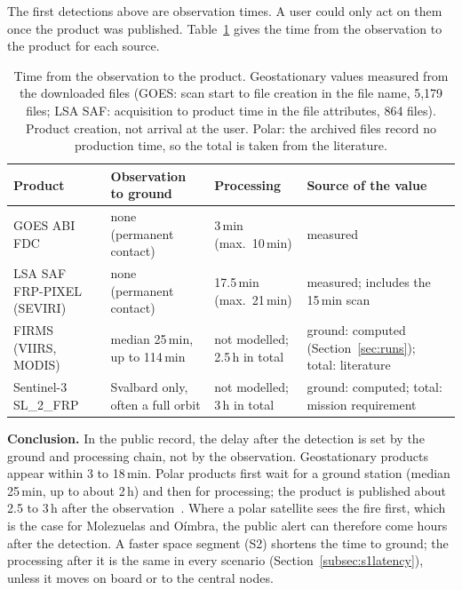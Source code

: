 \documentclass[11pt]{article}
\begin{document}
The first detections above are observation times. A user could only act on them once the product was published. Table~\ref{tab:latency} gives the time from the observation to the product for each source.

\begin{longtable}{|p{3.4cm}|p{3.6cm}|p{3.6cm}|p{4.0cm}|}
\caption{Time from the observation to the product. Geostationary values measured from the downloaded files (GOES: scan start to file creation in the file name, 5{,}179 files; LSA SAF: acquisition to product time in the file attributes, 864 files). Product creation, not arrival at the user. Polar: the archived files record no production time, so the total is taken from the literature.}\label{tab:latency}\\
\hline
\rowcolor{tablehead}
\textbf{Product} & \textbf{Observation to ground} & \textbf{Processing} & \textbf{Source of the value} \\
\hline
\endhead
GOES ABI FDC & none (permanent contact) & 3\,min (max.\ 10\,min) & measured \\
\hline
LSA SAF FRP-PIXEL (SEVIRI) & none (permanent contact) & 17.5\,min (max.\ 21\,min) & measured; includes the 15\,min scan \\
\hline
FIRMS (VIIRS, MODIS) & median 25\,min, up to 114\,min & not modelled; 2.5\,h in total & ground: computed (Section~\ref{sec:runs}); total: literature~\cite{wooster2021active} \\
\hline
Sentinel-3 SL\_2\_FRP & Svalbard only, often a full orbit & not modelled; 3\,h in total & ground: computed; total: mission requirement~\cite{mecklenburg2015s3ops} \\
\hline
\end{longtable}

\textbf{Conclusion.} In the public record, the delay after the detection is set by the ground and processing chain, not by the observation. Geostationary products appear within 3 to 18\,min. Polar products first wait for a ground station (median 25\,min, up to about 2\,h) and then for processing; the product is published about 2.5 to 3\,h after the observation~\cite{wooster2021active,mecklenburg2015s3ops}. Where a polar satellite sees the fire first, which is the case for Molezuelas and O\'imbra, the public alert can therefore come hours after the detection. A faster space segment (S2) shortens the time to ground; the processing after it is the same in every scenario (Section~\ref{subsec:s1latency}), unless it moves on board or to the central nodes.
\end{document}
